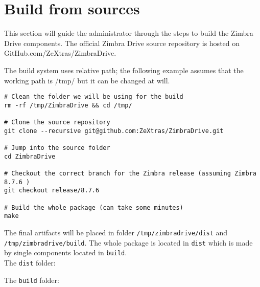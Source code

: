 \section{Build from sources}
This section will guide the administrator through the steps to build the Zimbra Drive components.
The official Zimbra Drive source repository is hosted on GitHub.com/ZeXtras/ZimbraDrive.

The build system uses relative path; the following example assumes that the working path is /tmp/
but it can be changed at will.
\begin{verbatim}
# Clean the folder we will be using for the build
rm -rf /tmp/ZimbraDrive && cd /tmp/

# Clone the source repository
git clone --recursive git@github.com:ZeXtras/ZimbraDrive.git

# Jump into the source folder
cd ZimbraDrive

# Checkout the correct branch for the Zimbra release (assuming Zimbra 8.7.6 )
git checkout release/8.7.6

# Build the whole package (can take some minutes)
make
\end{verbatim}

The final artifacts will be placed in folder \texttt{/tmp/zimbradrive/dist} and \texttt{/tmp/zimbradrive/build}.
The whole package is located in \texttt{dist} which is made by single components located in \texttt{build}.\\
The \texttt{dist} folder:

The \texttt{build} folder:

